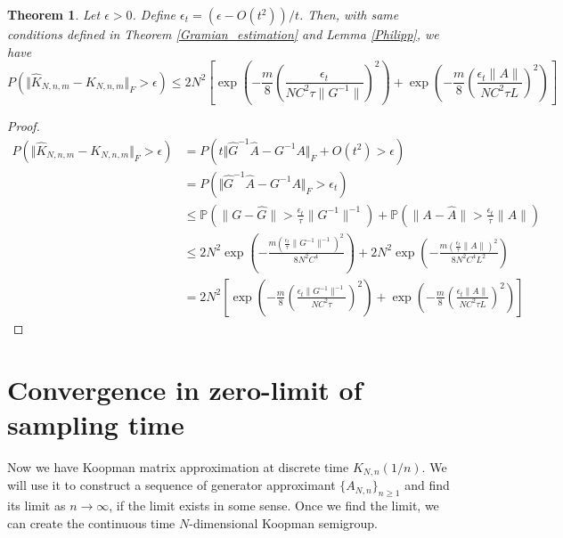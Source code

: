 \documentclass{article}[11]
\newtheorem{theorem}{Theorem}
\begin{document}
\begin{theorem}
	Let $\epsilon>0$. Define $\epsilon_t = \left(\epsilon - O(t^2)\right)/t$. Then, with same conditions defined in Theorem \ref{Gramian_estimation} and Lemma \ref{Philipp}, we have
	\begin{equation*}
		P\left(\Vert \widehat{K}_{N,n,m} - K_{N,n,m} \Vert_F > \epsilon \right) \leq 2N^2 \left[ \exp \left( -\frac{m}{8} \left(\frac{\epsilon_t}{N C^2 \tau \|G^{-1}\|}\right)^2 \right) + \exp \left( -\frac{m}{8} \left(\frac{\epsilon_t \|A\|}{N C^2 \tau L}\right)^2 \right) \right]
	\end{equation*}  
\end{theorem}
\begin{proof}
	\begin{align*}
		P\left(\Vert \widehat{K}_{N,n,m} - K_{N,n,m} \Vert_F > \epsilon \right) 
		&= P\left( t\Vert \widehat{G}^{-1} \widehat{A} - G^{-1}A \Vert_F + O(t^2) > \epsilon \right) \\
		&= P\left( \Vert \widehat{G}^{-1} \widehat{A} - G^{-1}A \Vert_F  > \epsilon_t \right) \\
		&\leq \mathbb{P}\left(\|G - \widehat{G}\| > \frac{\epsilon_t}{\tau} \|G^{-1}\|^{-1} \right) + \mathbb{P}\left(\|A - \widehat{A}\| > \frac{\epsilon_t}{\tau} \|A\| \right) \\
		&\leq 2N^2 \exp \left( -\frac{m (\frac{\epsilon_t}{\tau} \|G^{-1}\|^{-1})^2}{8 N^2 C^4} \right) + 2N^2 \exp \left( -\frac{m (\frac{\epsilon_t}{\tau} \|A\|)^2}{8 N^2 C^4 L^2} \right) \\
		&= 2N^2 \left[ \exp \left( -\frac{m}{8} \left(\frac{\epsilon_t \|G^{-1}\|^{-1}}{N C^2 \tau}\right)^2 \right) + \exp \left( -\frac{m}{8} \left(\frac{\epsilon_t \|A\|}{N C^2 \tau L}\right)^2 \right) \right]
	\end{align*}  
\end{proof}


\newpage
\section{Convergence in zero-limit of sampling time}
Now we have Koopman matrix approximation at discrete time $K_{N,n}(1/n)$. We will use it to construct a sequence of generator approximant $\{A_{N,n}\}_{n\geq 1}$ and find its limit as $n\to\infty$, if the limit exists in some sense. Once we find the limit, we can create the continuous time $N$-dimensional Koopman semigroup. 
\end{document}
